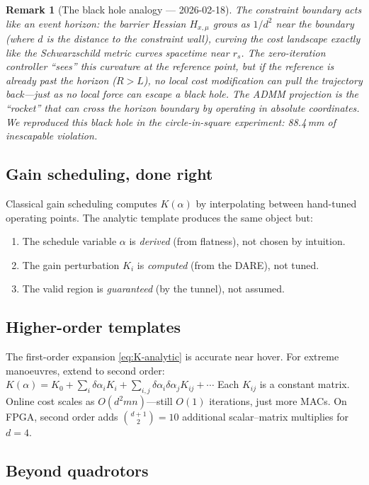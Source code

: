 \documentclass[11pt]{article}
\newtheorem{remark}[theorem]{Remark}
\begin{document}
\begin{remark}[The black hole analogy --- 2026-02-18]
The constraint boundary acts like an event horizon:
the barrier Hessian $H_{x,\mu}$ grows as
$1/d^2$ near the boundary (where $d$ is the
distance to the constraint wall),
curving the cost landscape exactly like
the Schwarzschild metric curves spacetime near $r_s$.
The zero-iteration controller ``sees'' this curvature
at the reference point, but if the reference
is already past the horizon ($R > L$), no local
cost modification can pull the trajectory back---just
as no local force can escape a black hole.
The ADMM projection is the ``rocket'' that can
cross the horizon boundary by operating in
absolute coordinates.
We reproduced this black hole in the circle-in-square
experiment: 88.4\,mm of inescapable violation.
\end{remark}

\subsection{Gain scheduling, done right}

Classical gain scheduling computes
$K(\alpha)$ by interpolating
between hand-tuned operating points.
The analytic template produces
the same object but:
\begin{enumerate}[leftmargin=6mm]
  \item The schedule variable $\alpha$
    is \emph{derived} (from flatness),
    not chosen by intuition.
  \item The gain perturbation $K_i$
    is \emph{computed} (from the DARE),
    not tuned.
  \item The valid region is
    \emph{guaranteed} (by the tunnel),
    not assumed.
\end{enumerate}

\subsection{Higher-order templates}

The first-order expansion \eqref{eq:K-analytic}
is accurate near hover.
For extreme manoeuvres,
extend to second order:
$K(\alpha) = K_0 + \sum_i \delta\alpha_i K_i
+ \sum_{i,j} \delta\alpha_i \delta\alpha_j K_{ij}
+ \cdots$
Each $K_{ij}$ is a constant matrix.
Online cost scales as $O(d^2 mn)$---still
$O(1)$ iterations, just more MACs.
On FPGA, second order adds $\binom{d+1}{2} = 10$
additional scalar--matrix multiplies for $d = 4$.

\subsection{Beyond quadrotors}
\end{document}
